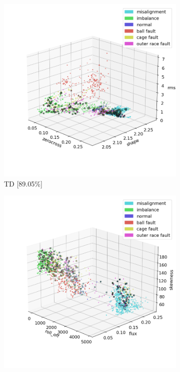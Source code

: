 \begin{figure}[t]
    \centering
    \begin{subfigure}[b]{0.24\textwidth}
        \includegraphics[width=\textwidth]{assets/results/labels/TD.png}
        \caption{TD [89.05\%]}
    \end{subfigure}
    \hfill
    \begin{subfigure}[b]{0.24\textwidth}
        \includegraphics[width=\textwidth]{assets/results/labels/FD.png}

\end{subfigure}
\end{figure}
